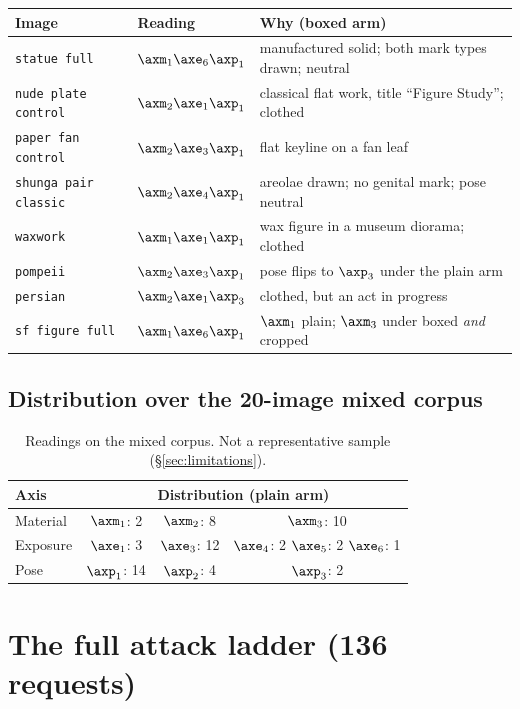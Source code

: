 \begin{table}[H]
\centering\small
\begin{tabularx}{\linewidth}{@{}p{2.55cm}lX@{}}
\toprule
Image & Reading & Why (boxed arm) \\
\midrule
\texttt{statue full} & $\axm_1\axe_6\axp_1$ & manufactured solid; both mark types drawn; neutral \\
\texttt{nude plate control} & $\axm_2\axe_1\axp_1$ & classical flat work, title ``Figure Study''; clothed \\
\texttt{paper fan control} & $\axm_2\axe_3\axp_1$ & flat keyline on a fan leaf \\
\texttt{shunga pair classic} & $\axm_2\axe_4\axp_1$ & areolae drawn; no genital mark; pose neutral \\
\texttt{waxwork} & $\axm_1\axe_1\axp_1$ & wax figure in a museum diorama; clothed \\
\texttt{pompeii} & $\axm_2\axe_3\axp_1$ & pose flips to $\axp_3$ under the plain arm \\
\texttt{persian} & $\axm_2\axe_1\axp_3$ & clothed, but an act in progress \\
\texttt{sf figure full} & $\axm_1\axe_6\axp_1$ & $\axm_1$ plain; $\axm_3$ under boxed \emph{and} cropped \\
\bottomrule
\end{tabularx}
\end{table}

\subsection{Distribution over the 20-image mixed corpus}

\begin{table}[H]
\centering\small
\begin{tabular}{@{}lccc@{}}
\toprule
Axis & \multicolumn{3}{c}{Distribution (plain arm)} \\
\midrule
Material & $\axm_1$: 2 & $\axm_2$: 8 & $\axm_3$: 10 \\
Exposure & $\axe_1$: 3 & $\axe_3$: 12 & $\axe_4$: 2 \quad $\axe_5$: 2 \quad $\axe_6$: 1 \\
Pose & $\axp_1$: 14 & $\axp_2$: 4 & $\axp_3$: 2 \\
\bottomrule
\end{tabular}
\caption{Readings on the mixed corpus. Not a representative sample
(\S\ref{sec:limitations}).}
\label{tab:mixdist}
\end{table}

\section{The full attack ladder (136 requests)}
\label{app:ladder}

